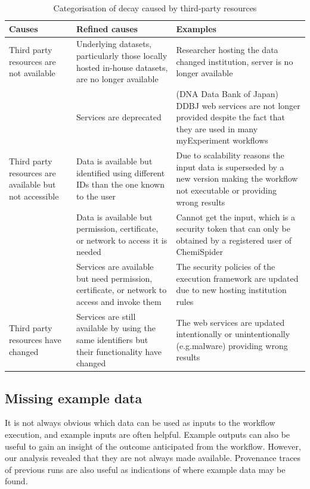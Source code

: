 \begin{table}[ht]
\caption{Categorisation of decay caused by third-party resources} %
\centering  %
\begin{tabular}{p{1.6in} p{2.2in} p{2.2in}} %
\hline\hline                        %
Causes &  Refined causes & Examples \\
\hline                  

Third party resources are not available & Underlying datasets, particularly those locally hosted in-house datasets, are no longer available & Researcher hosting the data changed institution, server is no longer available 
\\ \cline{2-3} 
			 									& Services are deprecated & (DNA Data Bank of Japan) DDBJ web services are not longer provided despite the fact that they are used in many myExperiment workflows
 \\ \hline

Third party resources are available but not accessible & Data is available but identified using different IDs than the one known to the user & Due to scalability reasons the input data is superseded by a new version making the workflow not executable or providing wrong results
\\ \cline{2-3}

								& Data is available but permission, certificate, or network to access it is needed & Cannot get the input, which is a security token that can only be obtained by a registered user of ChemiSpider
\\ \cline{2-3}
								& Services are available but need permission, certificate, or network to access and invoke them	& The security policies of the execution framework are updated due to new hosting institution rules \\
\hline
Third party resources have changed &  Services are still available by using the same identifiers but their functionality have changed & The web services are updated intentionally or unintentionally (e.g.malware) providing wrong results \\
\hline
\end{tabular}
\label{table:decay} %
\end{table}

\subsection{Missing example data}
It is not always obvious which data can be used as inputs to the workflow execution, and example inputs are often helpful.  Example outputs can also be useful to gain an insight of the outcome anticipated from the workflow. However, our analysis revealed that they are not always made available. Provenance traces of previous runs are also useful as indications of where example data may be found.


